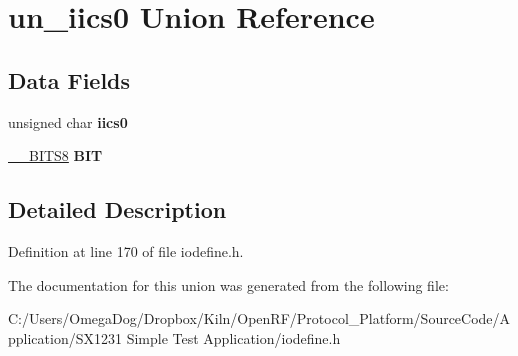 \hypertarget{unionun__iics0}{\section{un\-\_\-iics0 Union Reference}
\label{unionun__iics0}
}
\subsection*{Data Fields}
\begin{DoxyCompactItemize}
\item 
\hypertarget{unionun__iics0_a3e275d36e65e5a4c4a3ea7e2c72404bd}{unsigned char {\bfseries iics0}}\label{unionun__iics0_a3e275d36e65e5a4c4a3ea7e2c72404bd}

\item 
\hypertarget{unionun__iics0_af303a6cb3fde3e06298ace7ef16b3b04}{\hyperlink{struct_____b_i_t_s8}{\-\_\-\-\_\-\-B\-I\-T\-S8} {\bfseries B\-I\-T}}\label{unionun__iics0_af303a6cb3fde3e06298ace7ef16b3b04}

\end{DoxyCompactItemize}


\subsection{Detailed Description}


Definition at line 170 of file iodefine.\-h.



The documentation for this union was generated from the following file\-:\begin{DoxyCompactItemize}
\item 
C\-:/\-Users/\-Omega\-Dog/\-Dropbox/\-Kiln/\-Open\-R\-F/\-Protocol\-\_\-\-Platform/\-Source\-Code/\-Application/\-S\-X1231 Simple Test Application/iodefine.\-h\end{DoxyCompactItemize}
